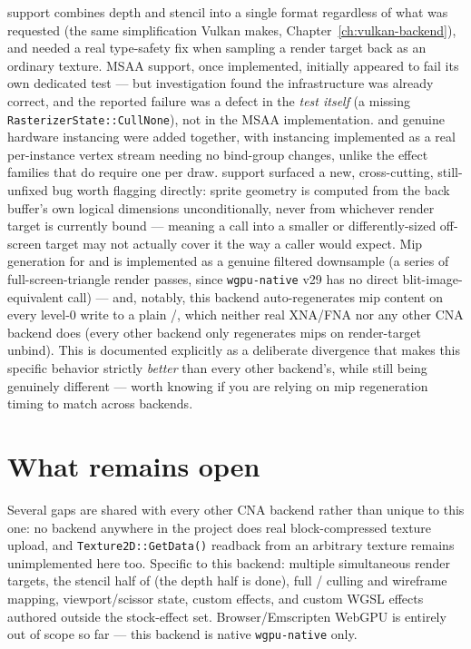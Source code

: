  support combines depth and stencil into a single format regardless
of what was requested (the same simplification Vulkan makes, Chapter~\ref{ch:vulkan-backend}),
and needed a real type-safety fix when sampling a render target back as an ordinary texture.
MSAA support, once implemented, initially appeared to fail its own dedicated test --- but
investigation found the infrastructure was already correct, and the reported failure was a
defect in the \emph{test itself} (a missing \texttt{RasterizerState::CullNone}), not in the
MSAA implementation.  and genuine hardware instancing were
added together, with instancing implemented as a real per-instance vertex stream needing no
bind-group changes, unlike the effect families that do require one per draw.
 support surfaced a new, cross-cutting, still-unfixed bug worth
flagging directly: sprite geometry is computed from the back buffer's own logical dimensions
unconditionally, never from whichever render target is currently bound --- meaning a
 call into a smaller or differently-sized off-screen target may
not actually cover it the way a caller would expect. Mip generation for 
and  is implemented as a genuine filtered downsample (a series of
full-screen-triangle render passes, since \texttt{wgpu-native} v29 has no direct
blit-image-equivalent call) --- and, notably, this backend auto-regenerates mip content on
every level-0 write to a plain /, which neither real
XNA/FNA nor any other CNA backend does (every other backend only regenerates mips on
render-target unbind). This is documented explicitly as a deliberate divergence that makes
this specific behavior strictly \emph{better} than every other backend's, while still being
genuinely different --- worth knowing if you are relying on mip regeneration timing to match
across backends.

\section{What remains open}

Several gaps are shared with every other CNA backend rather than unique to this one: no
backend anywhere in the project does real block-compressed texture upload, and
\texttt{Texture2D::GetData()} readback from an arbitrary texture remains unimplemented here
too. Specific to this backend: multiple simultaneous render targets, the stencil half of
 (the depth half is done), full /%
 culling and wireframe mapping, viewport/scissor state, custom
 effects, and custom WGSL effects authored outside the stock-effect
set. Browser/Emscripten WebGPU is entirely out of scope so far --- this backend is native
\texttt{wgpu-native} only.

